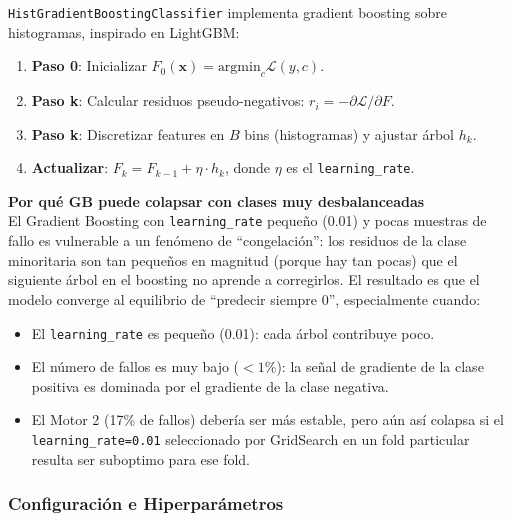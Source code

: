 \documentclass[12pt,a4paper]{article}
\begin{document}
\texttt{HistGradientBoostingClassifier} implementa gradient boosting sobre histogramas,
inspirado en LightGBM:

\begin{enumerate}[itemsep=2pt]
  \item \textbf{Paso 0}: Inicializar $F_0(\mathbf{x}) = \text{argmin}_c \mathcal{L}(y, c)$.
  \item \textbf{Paso k}: Calcular residuos pseudo-negativos: $r_i = -\partial \mathcal{L}/\partial F$.
  \item \textbf{Paso k}: Discretizar features en $B$ bins (histogramas) y ajustar \'{a}rbol $h_k$.
  \item \textbf{Actualizar}: $F_k = F_{k-1} + \eta \cdot h_k$, donde $\eta$ es el \texttt{learning\_rate}.
\end{enumerate}

\begin{porquebox}
\textbf{Por qu\'{e} GB puede colapsar con clases muy desbalanceadas}\\[4pt]
El Gradient Boosting con \texttt{learning\_rate} peque\~{n}o (0.01) y pocas muestras
de fallo es vulnerable a un fen\'{o}meno de ``congelaci\'{o}n'': los residuos de la clase
minoritaria son tan peque\~{n}os en magnitud (porque hay tan pocas) que el siguiente
\'{a}rbol en el boosting no aprende a corregirlos. El resultado es que el modelo
converge al equilibrio de ``predecir siempre 0'', especialmente cuando:
\begin{itemize}[itemsep=2pt]
  \item El \texttt{learning\_rate} es peque\~{n}o (0.01): cada \'{a}rbol contribuye poco.
  \item El n\'{u}mero de fallos es muy bajo ($<1\%$): la se\~{n}al de gradiente de la
    clase positiva es dominada por el gradiente de la clase negativa.
  \item El Motor 2 (17\% de fallos) deber\'{i}a ser m\'{a}s estable, pero a\'{u}n as\'{i}
    colapsa si el \texttt{learning\_rate=0.01} seleccionado por GridSearch en un fold
    particular resulta ser suboptimo para ese fold.
\end{itemize}
\end{porquebox}

\subsubsection{Configuraci\'{o}n e Hiperpar\'{a}metros}
\end{document}
